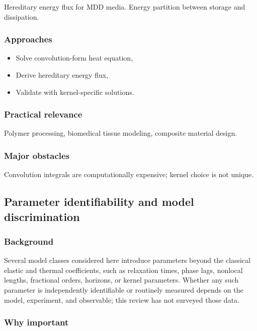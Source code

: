 Hereditary energy flux for MDD media. Energy partition between storage and dissipation.

\subsubsection{Approaches}

\begin{itemize}
\item Solve convolution-form heat equation,
\item Derive hereditary energy flux,
\item Validate with kernel-specific solutions.
\end{itemize}

\subsubsection{Practical relevance}

Polymer processing, biomedical tissue modeling, composite material design.

\subsubsection{Major obstacles}

Convolution integrals are computationally expensive; kernel choice is not unique.

\subsection{Parameter identifiability and model discrimination}
\label{sec:15.8}

\subsubsection{Background}

Several model classes considered here introduce parameters beyond the classical elastic and thermal coefficients, such as relaxation times, phase lags, nonlocal lengths, fractional orders, horizons, or kernel parameters. Whether any such parameter is independently identifiable or routinely measured depends on the model, experiment, and observable; this review has not surveyed those data.

\subsubsection{Why important}

